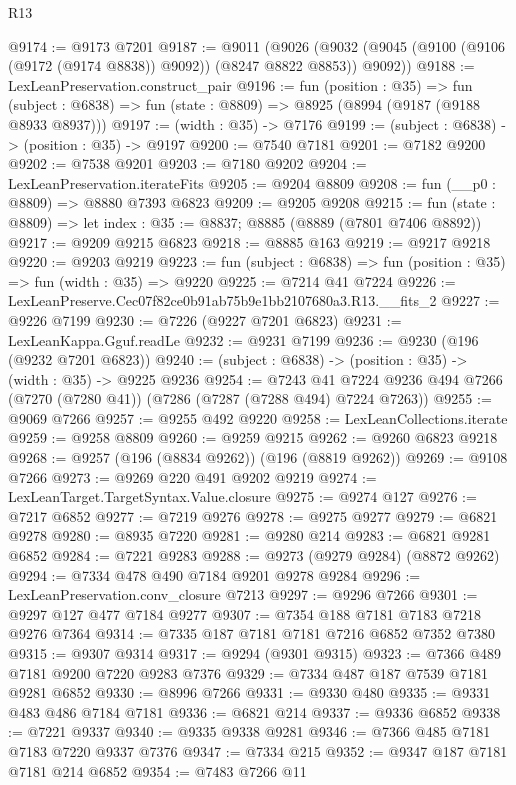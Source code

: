 \begin{lexlean}{R13}
\begin{coremodule}
@9174 := @9173 @7201
@9187 := @9011
    (@9026 (@9032 (@9045 (@9100 (@9106 (@9172 (@9174 @8838)) @9092)) (@8247 @8822 @8853)) @9092))
@9188 := LexLeanPreservation.construct_pair
@9196 := fun (position : @35) =>
  fun (subject : @6838) => fun (state : @8809) => @8925 (@8994 (@9187 (@9188 @8933 @8937)))
@9197 := (width : @35) -> @7176
@9199 := (subject : @6838) -> (position : @35) -> @9197
@9200 := @7540 @7181
@9201 := @7182 @9200
@9202 := @7538 @9201
@9203 := @7180 @9202
@9204 := LexLeanPreservation.iterateFits
@9205 := @9204 @8809
@9208 := fun (__p0 : @8809) => @8880 @7393 @6823
@9209 := @9205 @9208
@9215 := fun (state : @8809) => let index : @35 := @8837; @8885 (@8889 (@7801 @7406 @8892))
@9217 := @9209 @9215 @6823
@9218 := @8885 @163
@9219 := @9217 @9218
@9220 := @9203 @9219
@9223 := fun (subject : @6838) => fun (position : @35) => fun (width : @35) => @9220
@9225 := @7214 @41 @7224
@9226 := LexLeanPreserve.Cec07f82ce0b91ab75b9e1bb2107680a3.R13.__fits_2
@9227 := @9226 @7199
@9230 := @7226 (@9227 @7201 @6823)
@9231 := LexLeanKappa.Gguf.readLe
@9232 := @9231 @7199
@9236 := @9230 (@196 (@9232 @7201 @6823))
@9240 := (subject : @6838) -> (position : @35) -> (width : @35) -> @9225 @9236
@9254 := @7243
    @41
    @7224
    @9236
    @494
    @7266
    (@7270 (@7280 @41))
    (@7286 (@7287 (@7288 @494) @7224 @7263))
@9255 := @9069 @7266
@9257 := @9255 @492 @9220
@9258 := LexLeanCollections.iterate
@9259 := @9258 @8809
@9260 := @9259 @9215
@9262 := @9260 @6823 @9218
@9268 := @9257 (@196 (@8834 @9262)) (@196 (@8819 @9262))
@9269 := @9108 @7266
@9273 := @9269 @220 @491 @9202 @9219
@9274 := LexLeanTarget.TargetSyntax.Value.closure
@9275 := @9274 @127
@9276 := @7217 @6852
@9277 := @7219 @9276
@9278 := @9275 @9277
@9279 := @6821 @9278
@9280 := @8935 @7220
@9281 := @9280 @214
@9283 := @6821 @9281 @6852
@9284 := @7221 @9283
@9288 := @9273 (@9279 @9284) (@8872 @9262)
@9294 := @7334 @478 @490 @7184 @9201 @9278 @9284
@9296 := LexLeanPreservation.conv_closure @7213
@9297 := @9296 @7266
@9301 := @9297 @127 @477 @7184 @9277
@9307 := @7354 @188 @7181 @7183 @7218 @9276 @7364
@9314 := @7335 @187 @7181 @7181 @7216 @6852 @7352 @7380
@9315 := @9307 @9314
@9317 := @9294 (@9301 @9315)
@9323 := @7366 @489 @7181 @9200 @7220 @9283 @7376
@9329 := @7334 @487 @187 @7539 @7181 @9281 @6852
@9330 := @8996 @7266
@9331 := @9330 @480
@9335 := @9331 @483 @486 @7184 @7181
@9336 := @6821 @214
@9337 := @9336 @6852
@9338 := @7221 @9337
@9340 := @9335 @9338 @9281
@9346 := @7366 @485 @7181 @7183 @7220 @9337 @7376
@9347 := @7334 @215
@9352 := @9347 @187 @7181 @7181 @214 @6852
@9354 := @7483 @7266 @11

\end{coremodule}
\end{lexlean}
